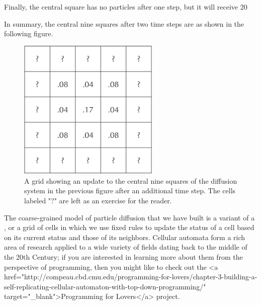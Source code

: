 {Finally, the central square has no particles after one step, but it will receive 20%

In summary, the central nine squares after two time steps are as shown in the following figure.

\begin{figure}[h]
\centering
\mySfFamily
\includegraphics[width = 0.6\textwidth]{../assets/images/600px/A_concentration_two_time_steps_partial.png}
\caption{A grid showing an update to the central nine squares of the diffusion system in the previous figure after an additional time step. The cells labeled "?" are left as an exercise for the reader.}
\label{fig:A_concentration_two_time_steps_partial}
\end{figure}

\begin{qbox}\end{qbox}


The coarse-grained model of particle diffusion that we have built is a variant of a , or a grid of cells in which we use fixed rules to update the status of a cell based on its current status and those of its neighbors. Cellular automata form a rich area of research applied to a wide variety of fields dating back to the middle of the 20th Century; if you are interested in learning more about them from the perspective of programming, then you might like to check out the <a href="http://compeau.cbd.cmu.edu/programming-for-lovers/chapter-3-building-a-self-replicating-cellular-automaton-with-top-down-programming/" target="_blank">Programming for Lovers</a> project.

}
